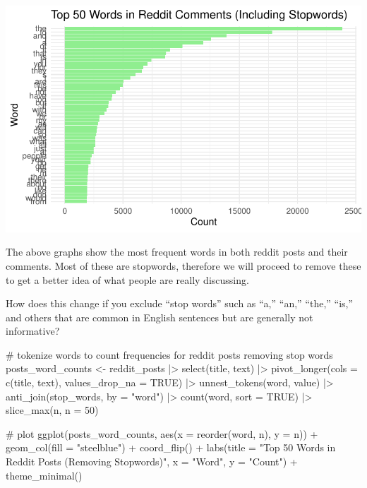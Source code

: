 \documentclass[
  letterpaper,
  DIV=11,
  numbers=noendperiod]{scrartcl}
\newenvironment{Shaded}{\begin{snugshade}}{\end{snugshade}}
\newcommand{\AttributeTok}[1]{\textcolor[rgb]{0.40,0.45,0.13}{#1}}
\newcommand{\CommentTok}[1]{\textcolor[rgb]{0.37,0.37,0.37}{#1}}
\newcommand{\ConstantTok}[1]{\textcolor[rgb]{0.56,0.35,0.01}{#1}}
\newcommand{\DecValTok}[1]{\textcolor[rgb]{0.68,0.00,0.00}{#1}}
\newcommand{\FunctionTok}[1]{\textcolor[rgb]{0.28,0.35,0.67}{#1}}
\newcommand{\NormalTok}[1]{\textcolor[rgb]{0.00,0.23,0.31}{#1}}
\newcommand{\OtherTok}[1]{\textcolor[rgb]{0.00,0.23,0.31}{#1}}
\newcommand{\SpecialCharTok}[1]{\textcolor[rgb]{0.37,0.37,0.37}{#1}}
\newcommand{\StringTok}[1]{\textcolor[rgb]{0.13,0.47,0.30}{#1}}
\begin{document}
\includegraphics{Reddit_eda_files/figure-pdf/unnamed-chunk-6-2.pdf}

The above graphs show the most frequent words in both reddit posts and
their comments. Most of these are stopwords, therefore we will proceed
to remove these to get a better idea of what people are really
discussing.

How does this change if you exclude ``stop words'' such as ``a,''
``an,'' ``the,'' ``is,'' and others that are common in English sentences
but are generally not informative?

\begin{Shaded}
\begin{Highlighting}[]
\CommentTok{\# tokenize words to count frequencies for reddit posts removing stop words}
\NormalTok{posts\_word\_counts }\OtherTok{\textless{}{-}}\NormalTok{ reddit\_posts }\SpecialCharTok{|\textgreater{}}
  \FunctionTok{select}\NormalTok{(title, text) }\SpecialCharTok{|\textgreater{}}
  \FunctionTok{pivot\_longer}\NormalTok{(}\AttributeTok{cols =} \FunctionTok{c}\NormalTok{(title, text), }\AttributeTok{values\_drop\_na =} \ConstantTok{TRUE}\NormalTok{) }\SpecialCharTok{|\textgreater{}}
  \FunctionTok{unnest\_tokens}\NormalTok{(word, value) }\SpecialCharTok{|\textgreater{}}
  \FunctionTok{anti\_join}\NormalTok{(stop\_words, }\AttributeTok{by =} \StringTok{"word"}\NormalTok{) }\SpecialCharTok{|\textgreater{}}
  \FunctionTok{count}\NormalTok{(word, }\AttributeTok{sort =} \ConstantTok{TRUE}\NormalTok{) }\SpecialCharTok{|\textgreater{}}
  \FunctionTok{slice\_max}\NormalTok{(n, }\AttributeTok{n =} \DecValTok{50}\NormalTok{)}

\CommentTok{\# plot}
\FunctionTok{ggplot}\NormalTok{(posts\_word\_counts, }\FunctionTok{aes}\NormalTok{(}\AttributeTok{x =} \FunctionTok{reorder}\NormalTok{(word, n), }\AttributeTok{y =}\NormalTok{ n)) }\SpecialCharTok{+}
  \FunctionTok{geom\_col}\NormalTok{(}\AttributeTok{fill =} \StringTok{"steelblue"}\NormalTok{) }\SpecialCharTok{+}
  \FunctionTok{coord\_flip}\NormalTok{() }\SpecialCharTok{+}
  \FunctionTok{labs}\NormalTok{(}\AttributeTok{title =} \StringTok{"Top 50 Words in Reddit Posts (Removing Stopwords)"}\NormalTok{,}
       \AttributeTok{x =} \StringTok{"Word"}\NormalTok{,}
       \AttributeTok{y =} \StringTok{"Count"}\NormalTok{) }\SpecialCharTok{+}
  \FunctionTok{theme\_minimal}\NormalTok{()}
\end{Highlighting}
\end{Shaded}
\end{document}
